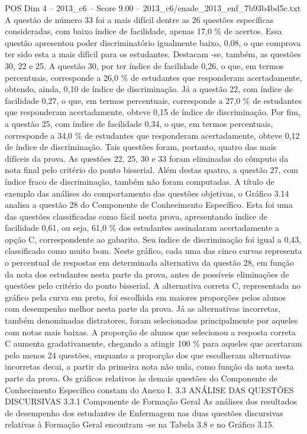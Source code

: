 \begin{textsample}{POS Dim 4 – 2013\_c6 – Score 9.00 – 2013\_c6/enade\_2013\_enf\_7b93b4bd5c.txt}
A questão de número 33 foi a mais difícil dentre as 26 questões específicas consideradas, com baixo índice de facilidade, apenas 17,0 \% de acertos.
Essa questão apresentou poder discriminatório igualmente baixo, 0,08, o que comprova ter sido esta a mais difícil para os estudantes.
Destacam -se, também, as questões 30, 22 e 25.
A questão 30, por ter índice de facilidade 0,26, o que, em termos percentuais, corresponde a 26,0 \% de estudantes que responderam acertadamente, obtendo, ainda, 0,10 de índice de discriminação.
Já a questão 22, com índice de facilidade 0,27, o que, em termos percentuais, corresponde a 27,0 \% de estudantes que responderam acertadamente, obteve 0,15 de índice de discriminação.
Por fim, a questão 25, com índice de facilidade 0,34, o que, em termos percentuais, corresponde a 34,0 \% de estudantes que responderam acertadamente, obteve 0,12 de índice de discriminação.
Tais questões foram, portanto, quatro das mais difíceis da prova.
As questões 22, 25, 30 e 33 foram eliminadas do cômputo da nota final pelo critério do ponto bisserial.
Além destas quatro, a questão 27, com índice fraco de discriminação, também não foram computadas.
A título de exemplo das análises do comportamento das questões objetivas, o Gráfico 3.14 analisa a questão 28 do Componente de Conhecimento Específico.
Esta foi uma das questões classificadas como fácil nesta prova, apresentando índice de facilidade 0,61, ou seja, 61,0 \% dos estudantes assinalaram acertadamente a opção C, correspondente ao gabarito.
Seu índice de discriminação foi igual a 0,43, classificado como muito bom.
Neste gráfico, cada uma das cinco curvas representa o percentual de respostas em determinada alternativa da questão 28, em função da nota dos estudantes nesta parte da prova, antes de possíveis eliminações de questões pelo critério do ponto bisserial.
A alternativa correta C, representada no gráfico pela curva em preto, foi escolhida em maiores proporções pelos alunos com desempenho melhor nesta parte da prova.
Já as alternativas incorretas, também denominadas distratores, foram selecionadas principalmente por aqueles com notas mais baixas.
A proporção de alunos que selecionou a resposta correta C aumenta gradativamente, chegando a atingir 100 \% para aqueles que acertaram pelo menos 24 questões, enquanto a proporção dos que escolheram alternativas incorretas decai, a partir da primeira nota não nula, como função da nota nesta parte da prova.
Os gráficos relativos às demais questões do Componente de Conhecimento Específico constam do Anexo I. 3.3 ANÁLISE DAS QUESTÕES DISCURSIVAS 3.3.1 Componente de Formação Geral As análises dos resultados de desempenho dos estudantes de Enfermagem nas duas questões discursivas relativas à Formação Geral encontram -se na Tabela 3.8 e no Gráfico 3.15.

\end{textsample}
